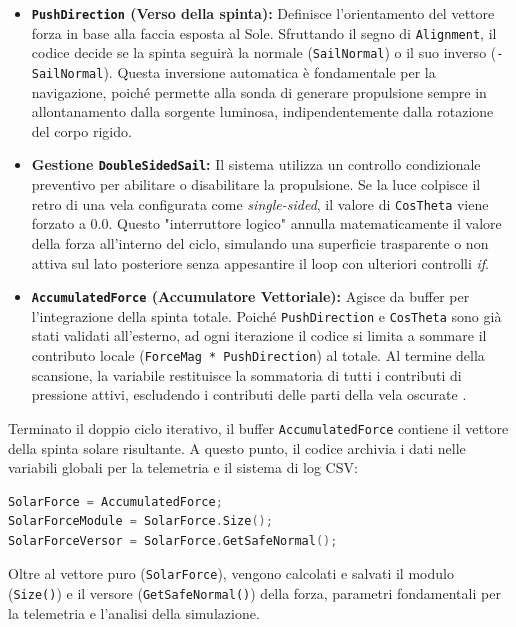 \begin{itemize}
\item \textbf{\lstinline|PushDirection| (Verso della spinta):} Definisce l'orientamento del vettore forza in base alla faccia esposta al Sole. Sfruttando il segno di \lstinline|Alignment|, il codice decide se la spinta seguirà la normale (\lstinline|SailNormal|) o il suo inverso (\lstinline|-SailNormal|). Questa inversione automatica è fondamentale per la navigazione, poiché permette alla sonda di generare propulsione sempre in allontanamento dalla sorgente luminosa, indipendentemente dalla rotazione del corpo rigido.
\item \textbf{Gestione \lstinline|DoubleSidedSail|:} Il sistema utilizza un controllo condizionale preventivo per abilitare o disabilitare la propulsione. Se la luce colpisce il retro di una vela configurata come \textit{single-sided}, il valore di \lstinline|CosTheta| viene forzato a $0.0$. Questo "interruttore logico" annulla matematicamente il valore della forza all'interno del ciclo, simulando una superficie trasparente o non attiva sul lato posteriore senza appesantire il loop con ulteriori controlli \textit{if}.
\item \textbf{\lstinline|AccumulatedForce| (Accumulatore Vettoriale):} Agisce da buffer per l'integrazione della spinta totale. Poiché \lstinline|PushDirection| e \lstinline|CosTheta| sono già stati validati all'esterno, ad ogni iterazione il codice si limita a sommare il contributo locale (\lstinline|ForceMag * PushDirection|) al totale. Al termine della scansione, la variabile restituisce la sommatoria di tutti i contributi di pressione attivi, escludendo i contributi delle parti della vela oscurate \cite{mcinnes1999solar, simo2016realistic}.
\end{itemize}

Terminato il doppio ciclo iterativo, il buffer \lstinline|AccumulatedForce| contiene il vettore della spinta solare risultante. A questo punto, il codice archivia i dati nelle variabili globali per la telemetria e il sistema di log CSV:

\begin{lstlisting}[language=C++, caption={Estrazione dei parametri telemetrici.}]
SolarForce = AccumulatedForce;
SolarForceModule = SolarForce.Size();
SolarForceVersor = SolarForce.GetSafeNormal();
\end{lstlisting}

Oltre al vettore puro (\lstinline|SolarForce|), vengono calcolati e salvati il modulo (\lstinline|Size()|) e il versore (\lstinline|GetSafeNormal()|) della forza, parametri fondamentali per la telemetria e l'analisi della simulazione.

